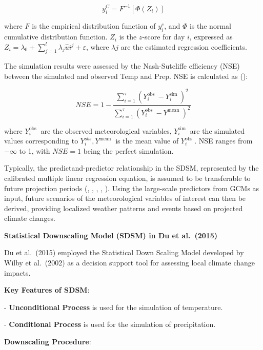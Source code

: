 \documentclass[
]{krantz}
\begin{document}
\[
y_{i}^{C}=F^{-1}\left[\Phi\left(Z_{i}\right)\right] \tag{30}
\]

where \(F\) is the empirical distribution function of \(y_{i}^{c}\), and \(\Phi\) is the normal cumulative distribution function. \(Z_{i}\) is the \(z\)-score for day \(i\), expressed as \(Z_{i}=\lambda_{0}+\sum_{j=1}^{l} \lambda_{j} \hat{u}{i}^{j}+\varepsilon\), where \(\lambda{j}\) are the estimated regression coefficients.

The simulation results were assessed by the Nash-Sutcliffe efficiency (NSE) between the simulated and observed Temp and Prep. NSE is calculated as (\citet{Nash1970}):

\[
N S E=1-\frac{\sum_{i=1}^{\tau}\left(Y_{i}^{\text {obs }}-Y_{i}^{\text {sim }}\right)^{2}}{\sum_{i=1}^{\tau}\left(Y_{i}^{\text {obs }}-Y^{\text {mean }}\right)^{2}}\tag{31}
\]

where \(Y_{i}^{\text {obs }}\) are the observed meteorological variables, \(Y_{i}^{\text {sim }}\) are the simulated values corresponding to \(Y_{i}^{o b s}, Y^{\text {mean }}\) is the mean value of \(Y_{i}^{\text {obs }}\). NSE ranges from \(-\infty\) to 1, with \(N S E=1\) being the perfect simulation.

Typically, the predictand-predictor relationship in the SDSM, represented by the calibrated multiple linear regression equation, is assumed to be transferable to future projection periods (\citet{Wilby2002}, \citet{Wilby2007}, \citet{Wilby2013}, \citet{Wetterhall2006}, \citet{Mullan2012}). Using the large-scale predictors from GCMs as input, future scenarios of the meteorological variables of interest can then be derived, providing localized weather patterns and events based on projected climate changes.

\textbf{Statistical Downscaling Model (SDSM) in Du et al.~(2015)}

Du et al.~(2015) employed the Statistical Down Scaling Model developed by Wilby et al.~(2002) as a decision support tool for assessing local climate change impacts.

\textbf{Key Features of SDSM}:

- \textbf{Unconditional Process} is used for the simulation of temperature.

- \textbf{Conditional Process} is used for the simulation of precipitation.

\textbf{Downscaling Procedure}:
\end{document}
